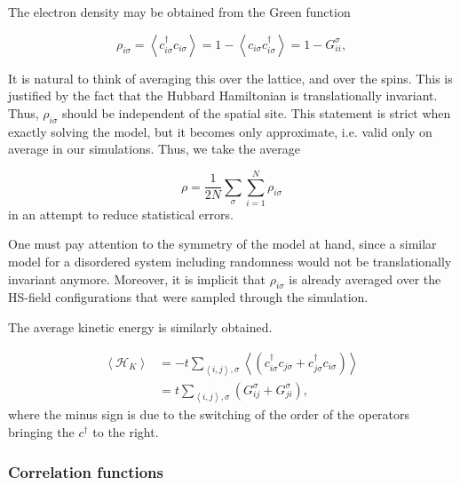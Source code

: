 \documentclass[10pt, twocolumn, twoside]{article}
\begin{document}
The electron density may be obtained from the Green function

\begin{equation}
\rho_{i\sigma} = \left\langle c_{i\sigma}^\dagger c_{i\sigma} \right\rangle = 1 - \left\langle c_{i\sigma} c_{i\sigma}^\dagger \right\rangle = 1 - G_{ii}^\sigma ,
\end{equation}

It is natural to think of averaging this over the lattice, and over the spins. This is justified by the fact that the Hubbard Hamiltonian is translationally invariant. Thus, $\rho_{i\sigma}$ should be independent of the spatial site. This statement is strict when exactly solving the model, but it becomes only approximate, i.e. valid only on average in our simulations. Thus, we take the average

\begin{equation}
\rho = \frac{1}{2N} \sum_\sigma \sum_{i=1}^N \rho_{i\sigma}
\end{equation}
in an attempt to reduce statistical errors.

One must pay attention to the symmetry of the model at hand, since a similar model for a disordered system including randomness would not be translationally invariant anymore. Moreover, it is implicit that $\rho_{i\sigma}$ is already averaged over the HS-field configurations that were sampled through the simulation.

The average kinetic energy is similarly obtained.

\begin{equation}
\begin{split}
\left\langle \mathcal{H}_K \right\rangle &= - t  \sum_{\left\langle i, j \right\rangle , \sigma} \left\langle ( c_{i\sigma}^\dagger c_{j\sigma} + c_{j\sigma}^\dagger c_{i\sigma} ) \right\rangle \\
&= t \sum_{\left\langle i, j \right\rangle , \sigma} ( G_{ij}^\sigma + G_{ji}^\sigma ) ,
\end{split}
\end{equation}
where the minus sign is due to the switching of the order of the operators bringing the $c^\dagger$ to the right.

\subsubsection{Correlation functions}\paragraph{}
\end{document}
